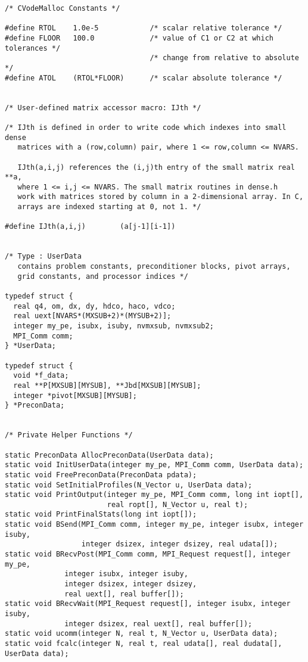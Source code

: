 \begin{verbatim}
/* CVodeMalloc Constants */

#define RTOL    1.0e-5            /* scalar relative tolerance */
#define FLOOR   100.0             /* value of C1 or C2 at which tolerances */
                                  /* change from relative to absolute      */
#define ATOL    (RTOL*FLOOR)      /* scalar absolute tolerance */


/* User-defined matrix accessor macro: IJth */

/* IJth is defined in order to write code which indexes into small dense
   matrices with a (row,column) pair, where 1 <= row,column <= NVARS.   

   IJth(a,i,j) references the (i,j)th entry of the small matrix real **a,
   where 1 <= i,j <= NVARS. The small matrix routines in dense.h
   work with matrices stored by column in a 2-dimensional array. In C,
   arrays are indexed starting at 0, not 1. */

#define IJth(a,i,j)        (a[j-1][i-1])


/* Type : UserData 
   contains problem constants, preconditioner blocks, pivot arrays, 
   grid constants, and processor indices */

typedef struct {
  real q4, om, dx, dy, hdco, haco, vdco;
  real uext[NVARS*(MXSUB+2)*(MYSUB+2)];
  integer my_pe, isubx, isuby, nvmxsub, nvmxsub2;
  MPI_Comm comm;
} *UserData;

typedef struct {
  void *f_data;
  real **P[MXSUB][MYSUB], **Jbd[MXSUB][MYSUB];
  integer *pivot[MXSUB][MYSUB];
} *PreconData;


/* Private Helper Functions */

static PreconData AllocPreconData(UserData data);
static void InitUserData(integer my_pe, MPI_Comm comm, UserData data);
static void FreePreconData(PreconData pdata);
static void SetInitialProfiles(N_Vector u, UserData data);
static void PrintOutput(integer my_pe, MPI_Comm comm, long int iopt[],
                        real ropt[], N_Vector u, real t);
static void PrintFinalStats(long int iopt[]);
static void BSend(MPI_Comm comm, integer my_pe, integer isubx, integer isuby,
                  integer dsizex, integer dsizey, real udata[]);
static void BRecvPost(MPI_Comm comm, MPI_Request request[], integer my_pe,
		      integer isubx, integer isuby,
		      integer dsizex, integer dsizey,
		      real uext[], real buffer[]);
static void BRecvWait(MPI_Request request[], integer isubx, integer isuby,
		      integer dsizex, real uext[], real buffer[]);
static void ucomm(integer N, real t, N_Vector u, UserData data);
static void fcalc(integer N, real t, real udata[], real dudata[], UserData data);


\end{verbatim}
